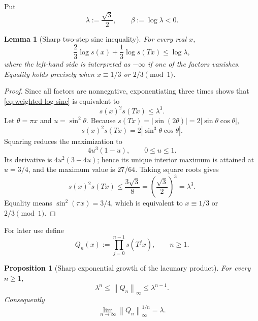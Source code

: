 \documentclass[11pt,oneside]{article}
\numberwithin{equation}{section}
\newtheorem{proposition}[theorem]{Proposition}
\newtheorem{lemma}[theorem]{Lemma}
\theoremstyle{definition}
\theoremstyle{remark}
\newcommand{\norm}[1]{\left\lVert#1\right\rVert}
\newcommand{\defeq}{\mathrel{:=}}
\begin{document}
Put
\begin{equation}
 \lambda\defeq\frac{\sqrt3}{2},
 \qquad \beta\defeq\log\lambda<0.
 \label{eq:lambda-beta}
\end{equation}

\begin{lemma}[Sharp two-step sine inequality]
\label{lem:sharp-sine-inequality}
For every real \(x\),
\begin{equation}
 \frac23\log s(x)+\frac13\log s(Tx)\le\log\lambda,
 \label{eq:weighted-log-sine}
\end{equation}
where the left-hand side is interpreted as \(-\infty\) if one of the factors vanishes.
Equality holds precisely when
\(x\equiv1/3\) or \(2/3\pmod1\).
\end{lemma}

\begin{proof}
Since all factors are nonnegative, exponentiating three times shows that
\eqref{eq:weighted-log-sine} is equivalent to
\begin{equation}
 s(x)^2s(Tx)\le\lambda^3.
 \label{eq:cubed-sine-ineq}
\end{equation}
Let \(\theta=\pi x\) and \(u=\sin^2\theta\).  Because
\(s(Tx)=|\sin(2\theta)|=2|\sin\theta\cos\theta|\),
\[
 s(x)^2s(Tx)=2|\sin^3\theta\cos\theta|.
\]
Squaring reduces the maximization to
\[
 4u^3(1-u),\qquad 0\le u\le1.
\]
Its derivative is \(4u^2(3-4u)\); hence its unique interior maximum is attained at
\(u=3/4\), and the maximum value is \(27/64\).  Taking square roots gives
\[
 s(x)^2s(Tx)\le\frac{3\sqrt3}{8}
 =\left(\frac{\sqrt3}{2}\right)^3=\lambda^3.
\]
Equality means \(\sin^2(\pi x)=3/4\), which is equivalent to
\(x\equiv1/3\) or \(2/3\pmod1\).
\end{proof}

For later use define
\begin{equation}
 Q_n(x)\defeq\prod_{j=0}^{n-1}s(T^jx),
 \qquad n\ge1.
 \label{eq:Qn}
\end{equation}

\begin{proposition}[Sharp exponential growth of the lacunary product]
\label{prop:Qn-sup}
For every \(n\ge1\),
\begin{equation}
 \lambda^n\le \norm{Q_n}_\infty\le\lambda^{n-1}.
 \label{eq:Qn-sup-bounds}
\end{equation}
Consequently
\begin{equation}
 \lim_{n\to\infty}\norm{Q_n}_\infty^{1/n}=\lambda.
 \label{eq:Qn-sup-rate}
\end{equation}
\end{proposition}
\end{document}
